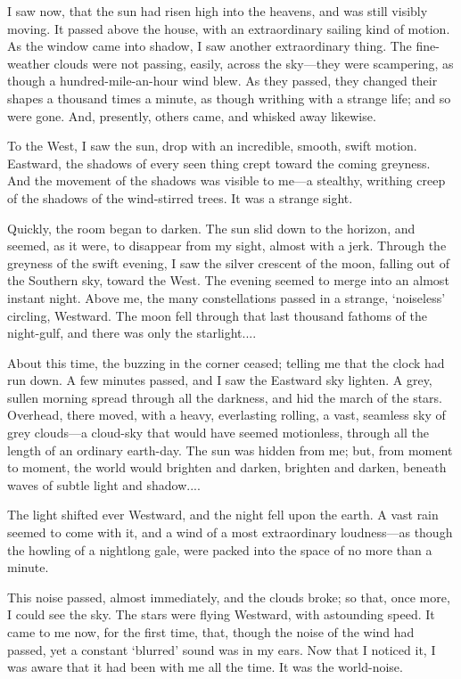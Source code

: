 I saw now, that the sun had risen high into the heavens, and was still visibly moving. It passed above the house, with an extraordinary sailing kind of motion. As the window came into shadow, I saw another extraordinary thing. The fine-weather clouds were not passing, easily, across the sky---they were scampering, as though a hundred-mile-an-hour wind blew. As they passed, they changed their shapes a thousand times a minute, as though writhing with a strange life; and so were gone. And, presently, others came, and whisked away likewise.

To the West, I saw the sun, drop with an incredible, smooth, swift motion. Eastward, the shadows of every seen thing crept toward the coming greyness. And the movement of the shadows was visible to me---a stealthy, writhing creep of the shadows of the wind-stirred trees. It was a strange sight.

Quickly, the room began to darken. The sun slid down to the horizon, and seemed, as it were, to disappear from my sight, almost with a jerk. Through the greyness of the swift evening, I saw the silver crescent of the moon, falling out of the Southern sky, toward the West. The evening seemed to merge into an almost instant night. Above me, the many constellations passed in a strange, ‘noiseless’ circling, Westward. The moon fell through that last thousand fathoms of the night-gulf, and there was only the starlight....

About this time, the buzzing in the corner ceased; telling me that the clock had run down. A few minutes passed, and I saw the Eastward sky lighten. A grey, sullen morning spread through all the darkness, and hid the march of the stars. Overhead, there moved, with a heavy, everlasting rolling, a vast, seamless sky of grey clouds---a cloud-sky that would have seemed motionless, through all the length of an ordinary earth-day. The sun was hidden from me; but, from moment to moment, the world would brighten and darken, brighten and darken, beneath waves of subtle light and shadow....

The light shifted ever Westward, and the night fell upon the earth. A vast rain seemed to come with it, and a wind of a most extraordinary loudness---as though the howling of a nightlong gale, were packed into the space of no more than a minute.

This noise passed, almost immediately, and the clouds broke; so that, once more, I could see the sky. The stars were flying Westward, with astounding speed. It came to me now, for the first time, that, though the noise of the wind had passed, yet a constant ‘blurred’ sound was in my ears. Now that I noticed it, I was aware that it had been with me all the time. It was the world-noise.

